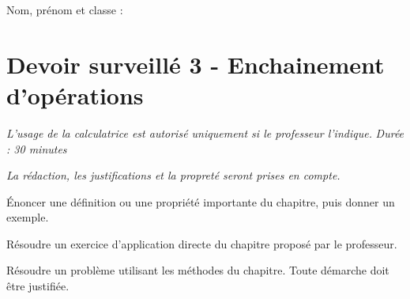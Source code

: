 \documentclass[a4paper,10pt]{report}
\begin{document}
\pagestyle{empty}
\noindent Nom, prénom et classe : \dotfill

\section*{Devoir surveillé 3 - Enchainement d'opérations}

\noindent \textit{L'usage de la calculatrice est autorisé uniquement si le professeur l'indique.} \hfill \textit{Durée : 30 minutes}

\medskip
\noindent \textit{La rédaction, les justifications et la propreté seront prises en compte.}


\begin{ex}
Énoncer une définition ou une propriété importante du chapitre, puis donner un exemple.
\medskip\noindent\grandscarreaux{\linewidth}{3cm}
\end{ex}
\begin{ex}[Application]
Résoudre un exercice d'application directe du chapitre proposé par le professeur.
\medskip\noindent\grandscarreaux{\linewidth}{5cm}
\end{ex}
\begin{ex}[Problème]
Résoudre un problème utilisant les méthodes du chapitre. Toute démarche doit être justifiée.
\medskip\noindent\grandscarreaux{\linewidth}{5cm}
\end{ex}
\end{document}
